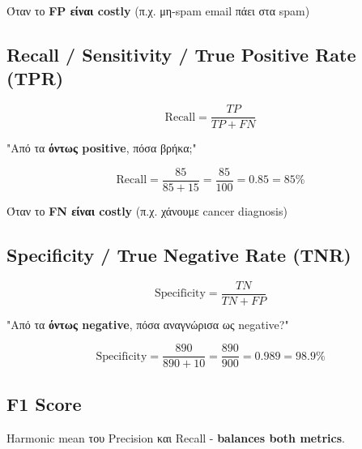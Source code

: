 \begin{infobox}
Όταν το \textbf{FP είναι costly} (π.χ. μη-spam email πάει στα spam)
\end{infobox}

\subsection{Recall / Sensitivity / True Positive Rate (TPR)}

\begin{formulabox}[Recall]
\begin{equation}
\text{Recall} = \frac{TP}{TP + FN}
\end{equation}

"Από τα \textbf{όντως positive}, πόσα βρήκα;"
\end{formulabox}

\begin{examplebox}
\[
\text{Recall} = \frac{85}{85 + 15} = \frac{85}{100} = 0.85 = 85\%
\]
\end{examplebox}

\begin{infobox}
Όταν το \textbf{FN είναι costly} (π.χ. χάνουμε cancer diagnosis)
\end{infobox}

\subsection{Specificity / True Negative Rate (TNR)}

\begin{formulabox}[Specificity]
\begin{equation}
\text{Specificity} = \frac{TN}{TN + FP}
\end{equation}

"Από τα \textbf{όντως negative}, πόσα αναγνώρισα ως negative?"
\end{formulabox}

\begin{examplebox}
\[
\text{Specificity} = \frac{890}{890 + 10} = \frac{890}{900} = 0.989 = 98.9\%
\]
\end{examplebox}

\subsection{F1 Score}

Harmonic mean του Precision και Recall - \textbf{balances both metrics}.

